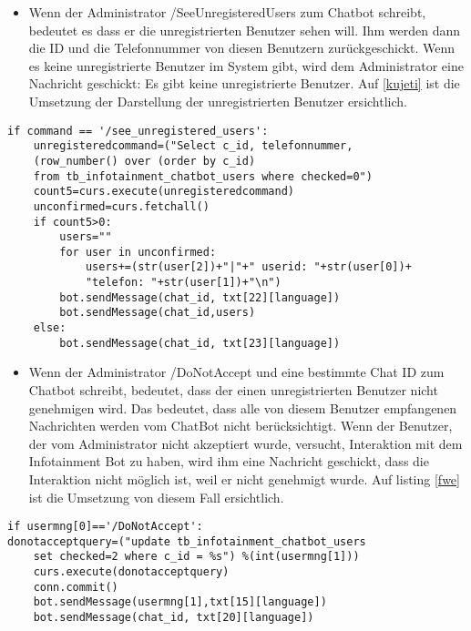\label{kuje}
\begin{itemize}
	\item Wenn der Administrator /SeeUnregisteredUsers zum Chatbot schreibt, bedeutet es dass er die unregistrierten Benutzer sehen will. Ihm werden dann die ID und die Telefonnummer von diesen Benutzern zurückgeschickt. Wenn es keine unregistrierte Benutzer im System gibt, wird dem Administrator eine Nachricht geschickt: Es gibt keine unregistrierte Benutzer. Auf \ref{kujeti} ist die Umsetzung der Darstellung der unregistrierten Benutzer ersichtlich.
\end{itemize}
\begin{lstlisting}[frame=single]
if command == '/see_unregistered_users':
	unregisteredcommand=("Select c_id, telefonnummer,
	(row_number() over (order by c_id) 
	from tb_infotainment_chatbot_users where checked=0")
	count5=curs.execute(unregisteredcommand)
	unconfirmed=curs.fetchall()
	if count5>0:
		users=""
		for user in unconfirmed:
			users+=(str(user[2])+"|"+" userid: "+str(user[0])+
			"telefon: "+str(user[1])+"\n")
		bot.sendMessage(chat_id, txt[22][language])
		bot.sendMessage(chat_id,users)
	else:
		bot.sendMessage(chat_id, txt[23][language])	
\end{lstlisting}
\label{kujeti}
\begin{itemize}
	\item Wenn der Administrator /DoNotAccept und eine bestimmte Chat ID zum Chatbot schreibt, bedeutet, dass der einen unregistrierten Benutzer nicht genehmigen wird. Das bedeutet, dass alle von diesem Benutzer empfangenen Nachrichten werden vom ChatBot nicht berücksichtigt. Wenn der Benutzer, der vom Administrator nicht akzeptiert wurde, versucht, Interaktion mit dem Infotainment Bot zu haben, wird ihm eine Nachricht geschickt, dass die Interaktion nicht m\"oglich ist, weil er nicht genehmigt wurde. Auf listing \ref{fwe} ist die Umsetzung von diesem Fall ersichtlich. 
\end{itemize}	
\begin{lstlisting}[frame=single]
if usermng[0]=='/DoNotAccept':
donotacceptquery=("update tb_infotainment_chatbot_users 
	set checked=2 where c_id = %s") %(int(usermng[1]))
	curs.execute(donotacceptquery)
	conn.commit()
	bot.sendMessage(usermng[1],txt[15][language])
	bot.sendMessage(chat_id, txt[20][language])
\end{lstlisting}
